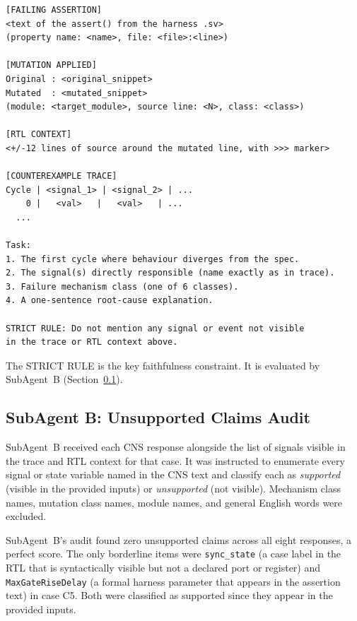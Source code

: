 \documentclass[11pt,a4paper]{article}
\begin{document}
\begin{lstlisting}[caption={CNS prompt template (abbreviated).},
                   label={lst:prompt}, language={}]
[FAILING ASSERTION]
<text of the assert() from the harness .sv>
(property name: <name>, file: <file>:<line>)

[MUTATION APPLIED]
Original : <original_snippet>
Mutated  : <mutated_snippet>
(module: <target_module>, source line: <N>, class: <class>)

[RTL CONTEXT]
<+/-12 lines of source around the mutated line, with >>> marker>

[COUNTEREXAMPLE TRACE]
Cycle | <signal_1> | <signal_2> | ...
    0 |   <val>   |   <val>   | ...
  ...

Task:
1. The first cycle where behaviour diverges from the spec.
2. The signal(s) directly responsible (name exactly as in trace).
3. Failure mechanism class (one of 6 classes).
4. A one-sentence root-cause explanation.

STRICT RULE: Do not mention any signal or event not visible
in the trace or RTL context above.
\end{lstlisting}

\noindent The STRICT RULE is the key faithfulness constraint. It is evaluated
by SubAgent~B (Section~\ref{sec:subagentb}).

\subsection{SubAgent B: Unsupported Claims Audit}
\label{sec:subagentb}

SubAgent~B received each CNS response alongside the list of signals visible in
the trace and RTL context for that case. It was instructed to enumerate every
signal or state variable named in the CNS text and classify each as
\emph{supported} (visible in the provided inputs) or \emph{unsupported} (not
visible). Mechanism class names, mutation class names, module names, and general
English words were excluded.

SubAgent~B's audit found zero unsupported claims across all eight responses, a
perfect score. The only borderline items were \texttt{sync\_state} (a case
label in the RTL that is syntactically visible but not a declared port or
register) and \texttt{MaxGateRiseDelay} (a formal harness parameter that
appears in the assertion text) in case C5. Both were classified as supported
since they appear in the provided inputs.

\end{document}
